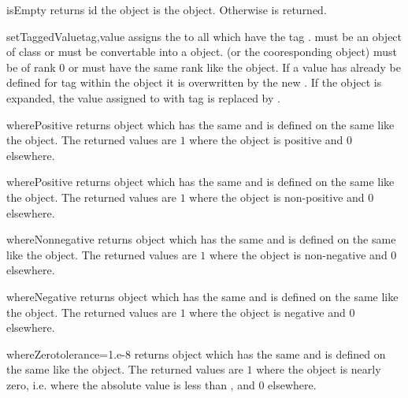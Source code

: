 \begin{methoddesc}[Data]{isEmpty}{}
returns \True id the \Data object is the \EmptyData object.
Otherwise \False is returned.
\end{methoddesc}

\begin{methoddesc}[Data]{setTaggedValue}{tag,value}
assigns the  to all \DataSamplePoints which have the tag
.  must be an object of class
 or must be convertable into a
 object.  (or the cooresponding
 object) must be of rank $0$ or must have the
same rank like the object.
If a value has already be defined for tag  within the object
it is overwritten by the new .  If the object is expanded,
the value assigned to \DataSamplePoints with tag  is replaced by
.
\end{methoddesc}

\begin{methoddesc}[Data]{wherePositive}{}
returns \Data object which has the same \Shape and is defined on
the same \FunctionSpace like the object. The returned values are $1$
where the object is positive and $0$ elsewhere.
\end{methoddesc}

\begin{methoddesc}[Data]{wherePositive}{}
returns \Data object which has the same \Shape and is defined on
the same \FunctionSpace like the object. The returned values are $1$
where the object is non-positive and $0$ elsewhere.
\end{methoddesc}

\begin{methoddesc}[Data]{whereNonnegative}{}
returns \Data object which has the same \Shape and is defined on
the same \FunctionSpace like the object. The returned values are $1$
where the object is non-negative and $0$ elsewhere.
\end{methoddesc}

\begin{methoddesc}[Data]{whereNegative}{}
returns \Data object which has the same \Shape and is defined on
the same \FunctionSpace like the object. The returned values are $1$
where the object is negative and $0$ elsewhere.
\end{methoddesc}

\begin{methoddesc}[Data]{whereZero}{tolerance=1.e-8}
returns \Data object which has the same \Shape and is defined on
the same \FunctionSpace like the object. The returned values are $1$
where the object is nearly zero, i.e. where the absolute value is less
than , and $0$ elsewhere.
\end{methoddesc}

